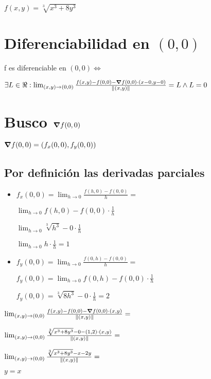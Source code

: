 \documentclass[../parcial.tex]{subfiles}
\begin{document}
    $ f(x,y) = \sqrt[3]{x^3+8y^3}$

    \section*{Diferenciabilidad en $(0,0)$}

    f es diferenciable en $(0,0) \Leftrightarrow$

    $ \exists L \in \real : \lim_{(x,y)\to (0,0)} \frac{f(x,y) - f(0,0) - \grad f (0,0) \cdot(x-0,y-0)}{\norm*{(x,y)}} = L \wedge L = 0 $

    \section*{Busco $\grad f(0,0)$}

    $ \grad f(0,0) = (f_x(0,0), f_y(0,0)) $

    \subsection*{Por definición las derivadas parciales}
    
    \begin{itemize}
        \item $ f_x(0,0) = \lim_{h\to0} \frac{f(h,0) - f(0,0)}{h} = $
        
            $ \lim_{h\to0} f(h,0) - f(0,0) \cdot \frac{1}{h} $

            $ \lim_{h\to0} \sqrt[3]{h^3} - 0 \cdot \frac{1}{h} $

            $ \lim_{h\to0} h \cdot \frac{1}{h} = 1 $

        \item $ f_y(0,0) = \lim_{h\to0} \frac{f(0,h) - f(0,0)}{h} = $

            $ f_y(0,0) = \lim_{h\to0} f(0,h) - f(0,0) \cdot \frac{1}{h} $

            $ f_y(0,0) = \sqrt[3]{8h^3} - 0 \cdot \frac{1}{h} = 2$

    \end{itemize}

    $\lim_{(x,y)\to (0,0)} \frac{f(x,y) - f(0,0) - \grad f (0,0) \cdot(x,y)}{\norm*{(x,y)}} = $

    $\lim_{(x,y)\to (0,0)} \frac{\sqrt[3]{x^3+8y^3} - 0 - (1,2)\cdot(x,y)}{\norm*{(x,y)}} = $

    $\lim_{(x,y)\to (0,0)} \frac{\sqrt[3]{x^3+8y^3} -x - 2y}{\norm*{(x,y)}} = $

    $ y = x $
\end{document}
